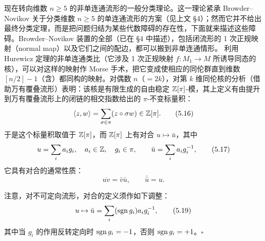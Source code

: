 现在转向维数 $n\ge 5$ 的非单连通流形的一般分类理论。这一理论紧承 Browder--Novikov 关于分类维数 $n\ge 5$ 的单连通流形的方案（见上文 §4）；然而它并不给出最终分类定理，而是把问题归结为某些代数障碍的存在性，下面就来描述这些障碍。Browder--Novikov 装置的全部（已在 §4 中描述），包括闭流形的 1 次正规映射（normal map）以及它们之间的配边，都可以搬到非单连通情形。
利用 Hurewicz 定理的非单连通类比（它涉及 1 次正规映射 $f\colon M_{1}\to M$ 所诱导同态的核），可以对这样的映射作 Morse 手术，把它变成使相应的同伦群直到维数 $[n/2]-1$（含）都同构的映射。对偶数 $n$（$=2k$），对第 $k$ 维同伦核的分析（借助万有覆叠流形）表明：该核是有限生成的自由稳定 $\mathbb{Z}[\pi]$-模，其上定义有由提升到万有覆叠流形上的闭链的相交指数给出的 $\pi$-不变标量积：
\begin{equation}
\langle z,w\rangle=\sum_{\sigma\in\pi}(z\circ\sigma w)\in\mathbb{Z}[\pi]. \tag{5.16}
\end{equation}
于是这个标量积取值于 $\mathbb{Z}[\pi]$，而 $\mathbb{Z}[\pi]$ 上有对合 $u\mapsto\bar u$，其中
\begin{equation}
u=\sum_{i}a_{i}g_{i},\quad a_{i}\in\mathbb{Z},\quad g_{i}\in\pi,\qquad
\bar u=\sum_{i}a_{i}g_{i}^{-1}, \tag{5.17}
\end{equation}
它具有对合的通常性质：
\begin{equation}
\overline{uv}=\bar v\bar u,\qquad \bar{\bar u}=u. \tag{5.18}
\end{equation}

\begin{remark}
注意，对不可定向流形，对合的定义须作如下调整：
\begin{equation}
u\mapsto\bar u=\sum_{i}(\operatorname{sgn} g_{i})a_{i}g_{i}^{-1}, \tag{5.19}
\end{equation}
其中当 $g_{i}$ 的作用反转定向时 $\operatorname{sgn} g_{i}=-1$，否则 $\operatorname{sgn} g_{i}=+1$。\hfill$\square$
\end{remark}

